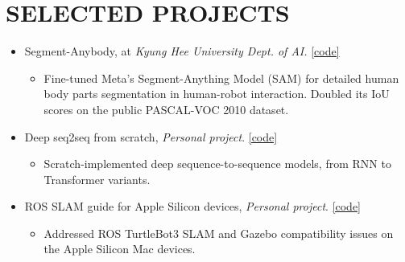 \documentclass[a4paper,10pt]{extarticle}
\begin{document}
\setlength{\itemsep}{10pt} %
\section*{SELECTED PROJECTS}
\begin{itemize}
	\item Segment-Anybody, at \textit{Kyung Hee University Dept. of AI.} \href{https://github.com/leehyeonbeen/segment-anything-fine-tuning}{[code]}

	      {\footnotesize
		      \vspace*{-0.2cm}
		      \begin{itemize}
			      \item Fine-tuned Meta's Segment-Anything Model (SAM) for detailed human body parts segmentation in human-robot interaction. Doubled its IoU scores on the public PASCAL-VOC 2010 dataset.
		      \end{itemize}
		      \vspace*{-0.2cm}
	      }

	\item Deep seq2seq from scratch, \textit{Personal project}. \href{https://github.com/leehyeonbeen/TimeSeriesSeq2Seq}{[code]}

	      {\footnotesize
		      \vspace*{-0.2cm}
		      \begin{itemize}
			      \item Scratch-implemented deep sequence-to-sequence models, from RNN to Transformer variants.
		      \end{itemize}
		      \vspace*{-0.2cm}
	      }

	\item ROS SLAM guide for Apple Silicon devices, \textit{Personal project}. \href{https://github.com/leehyeonbeen/ROS-SLAM-AppleSilicon}{[code]}

	      {\footnotesize
		      \vspace*{-0.2cm}
		      \begin{itemize}
			      \item Addressed ROS TurtleBot3 SLAM and Gazebo compatibility issues on the Apple Silicon Mac devices.
		      \end{itemize}
		      \vspace*{-0.2cm}
	      }





\end{itemize}
\end{document}
